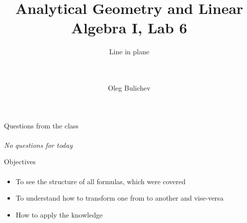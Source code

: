 \documentclass[aspectratio=169]{beamer}
\title[AGLA1]{Analytical Geometry and Linear Algebra I, Lab 6} %
\subtitle{Line in plane \\ \  \\ \    
         } %
\author{Oleg Bulichev}
\newcommand{\fbckg}[1]{\usebackgroundtemplate{\texttt{[image: \#1]}}}%
\begin{document}
\setlength{\abovedisplayskip}{0pt}
\setlength{\belowdisplayskip}{0pt}
\setlength{\abovedisplayshortskip}{0pt}
\setlength{\belowdisplayshortskip}{0pt}

\fbckg{fibeamer/figs/title_page.png}

\fbckg{fibeamer/figs/common.png}


\begin{frame}[c]{Questions from the class}
    \framesubtitle{}
    \centering
    \textit{ \Large No questions for today}
\end{frame}

\begin{frame}[t]{Objectives}
    \framesubtitle{}
    \begin{itemize}
        \item To see the structure of all formulas, which were covered
        \item To understand how to transform one from to another and vise-versa
        \item How to apply the knowledge
    \end{itemize}
\end{frame}
\end{document}

